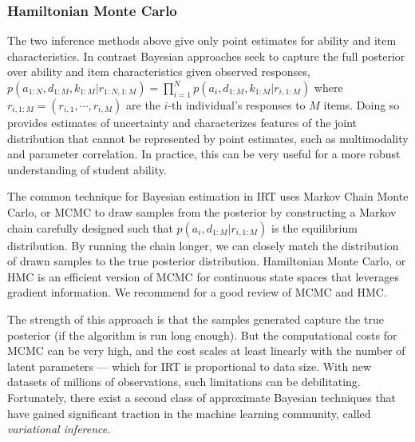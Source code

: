 \subsubsection{Hamiltonian Monte Carlo}
The two inference methods above give only point estimates for ability and item characteristics.
In contrast Bayesian approaches seek to capture the full posterior over ability and item characteristics given observed responses, $p(a_{1:N},d_{1:M},k_{1:M}|r_{1:N,1:M}) = \prod_{i=1}^N p(a_i,d_{1:M},k_{1:M}|r_{i,1:M})$ where $r_{i,1:M} = (r_{i,1}, \cdots, r_{i,M})$ are the $i$-th individual's responses to $M$ items. 
Doing so provides estimates of uncertainty and characterizes features of the joint distribution that cannot be represented by point estimates, such as multimodality and parameter correlation.
In practice, this can be very useful for a more robust understanding of student ability.

The common technique for Bayesian estimation in IRT uses Markov Chain Monte Carlo, or MCMC \cite{hastings1970monte, gelfand1990sampling} to draw samples from the posterior by constructing a Markov chain carefully designed such that $p(a_i,d_{1:M}|r_{i,1:M})$ is the equilibrium distribution.
By running the chain longer, we can closely match the distribution of drawn samples to the true posterior distribution.
Hamiltonian Monte Carlo, or HMC \cite{neal2011mcmc, neal1994improved, hoffman2014no} is an efficient version of MCMC for continuous state spaces that leverages gradient information.
We recommend \cite{hoffman2014no} for a good review of MCMC and HMC.

The strength of this approach is that the samples generated capture the true posterior (if the algorithm is run long enough).
But the computational costs for MCMC can be very high, and the cost scales at least linearly with the number of latent parameters --- which for IRT is proportional to data size.
With new datasets of millions of observations, such limitations can be debilitating.
Fortunately, there exist a second class of approximate Bayesian techniques that have gained significant traction in the machine learning community, called \textit{variational inference}.

